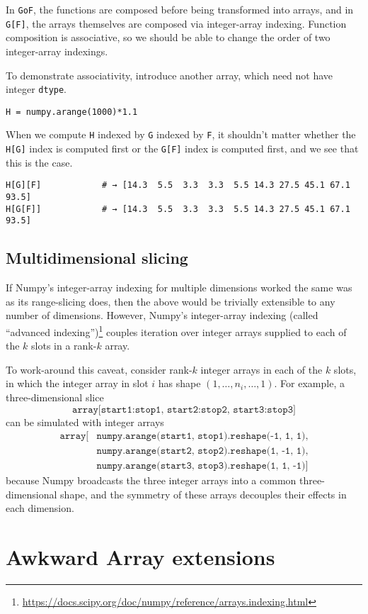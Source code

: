 \documentclass[12pt]{article}
\begin{document}
In \texttt{GoF}, the functions are composed before being transformed into arrays, and in \texttt{G[F]}, the arrays themselves are composed via integer-array indexing. Function composition is associative, so we should be able to change the order of two integer-array indexings.

To demonstrate associativity, introduce another array, which need not have integer \texttt{dtype}.
\begin{verbatim}
H = numpy.arange(1000)*1.1
\end{verbatim}
\noindent When we compute \texttt{H} indexed by \texttt{G} indexed by \texttt{F}, it shouldn't matter whether the \texttt{H[G]} index is computed first or the \texttt{G[F]} index is computed first, and we see that this is the case.
\begin{verbatim}
H[G][F]            # → [14.3  5.5  3.3  3.3  5.5 14.3 27.5 45.1 67.1 93.5]
H[G[F]]            # → [14.3  5.5  3.3  3.3  5.5 14.3 27.5 45.1 67.1 93.5]
\end{verbatim}

\subsection*{Multidimensional slicing}

If Numpy's integer-array indexing for multiple dimensions worked the same was as its range-slicing does, then the above would be trivially extensible to any number of dimensions. However, Numpy's integer-array indexing (called ``advanced indexing'')\footnote{\url{https://docs.scipy.org/doc/numpy/reference/arrays.indexing.html}} couples iteration over integer arrays supplied to each of the $k$ slots in a rank-$k$ array.

To work-around this caveat, consider rank-$k$ integer arrays in each of the $k$ slots, in which the integer array in slot $i$ has shape $(1, \ldots, n_i, \ldots, 1)$. For example, a three-dimensional slice
\[ \texttt{array[start1:stop1, start2:stop2, start3:stop3]} \]
\noindent can be simulated with integer arrays
\begin{align*}
\texttt{array[} & \texttt{numpy.arange(start1, stop1).reshape(-1, 1, 1),} \\
                            & \texttt{numpy.arange(start2, stop2).reshape(1, -1, 1),} \\
                            & \texttt{numpy.arange(start3, stop3).reshape(1, 1, -1)]}
\end{align*}
\noindent because Numpy broadcasts the three integer arrays into a common three-dimensional shape, and the symmetry of these arrays decouples their effects in each dimension.

\section*{Awkward Array extensions}
\end{document}
